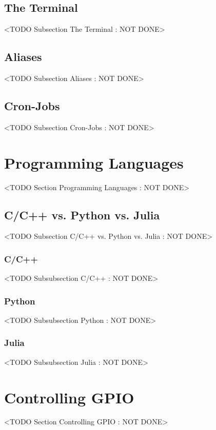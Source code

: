 \subsection{The Terminal}
	<TODO Subsection The Terminal : NOT DONE>

\subsection{Aliases}
	<TODO Subsection Aliases : NOT DONE>
	
\subsection{Cron-Jobs}
	<TODO Subsection Cron-Jobs : NOT DONE>

\section{Programming Languages}
	<TODO Section Programming Languages : NOT DONE>

\subsection{C/C++ vs. Python vs. Julia}
	<TODO Subsection C/C++ vs. Python vs. Julia : NOT DONE>

\subsubsection{C/C++}
	<TODO Subsubsection  C/C++ : NOT DONE>

\subsubsection{Python}
	<TODO Subsubsection  Python : NOT DONE>

\subsubsection{Julia}
	<TODO Subsubsection  Julia : NOT DONE>

\section{Controlling GPIO}
	<TODO Section Controlling GPIO : NOT DONE>

